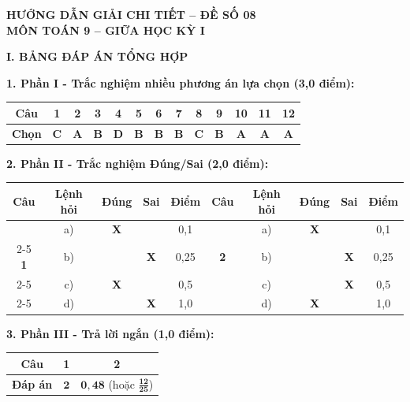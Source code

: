 \documentclass[12pt,a4paper]{article}
\begin{document}
\begin{center}
  \textbf{\Large HƯỚNG DẪN GIẢI CHI TIẾT -- ĐỀ SỐ 08}\\
  \textbf{\large MÔN TOÁN 9 -- GIỮA HỌC KỲ I}
\end{center}
\vspace{2mm}

\noindent\textbf{\large I. BẢNG ĐÁP ÁN TỔNG HỢP}

\vspace{1mm}
\noindent\textbf{1. Phần I - Trắc nghiệm nhiều phương án lựa chọn (3,0 điểm):}
\begin{center}
\begin{tabular}{|c|c|c|c|c|c|c|c|c|c|c|c|c|}
\hline
\textbf{Câu} & \textbf{1} & \textbf{2} & \textbf{3} & \textbf{4} & \textbf{5} & \textbf{6} & \textbf{7} & \textbf{8} & \textbf{9} & \textbf{10} & \textbf{11} & \textbf{12} \\
\hline
\textbf{Chọn} & \textbf{C} & \textbf{A} & \textbf{B} & \textbf{D} & \textbf{B} & \textbf{B} & \textbf{B} & \textbf{C} & \textbf{B} & \textbf{A} & \textbf{A} & \textbf{A} \\
\hline
\end{tabular}
\end{center}
\vspace{1mm}

\noindent\textbf{2. Phần II - Trắc nghiệm Đúng/Sai (2,0 điểm):}
\begin{center}
\begin{tabular}{|c|c|c|c|c||c|c|c|c|c|}
\hline
\textbf{Câu} & \textbf{Lệnh hỏi} & \textbf{Đúng} & \textbf{Sai} & \textbf{Điểm} & \textbf{Câu} & \textbf{Lệnh hỏi} & \textbf{Đúng} & \textbf{Sai} & \textbf{Điểm} \\
\hline
 & a) & \textbf{X} & & 0,1 & & a) & \textbf{X} & & 0,1 \\
\cline{2-5}\cline{7-10}
\textbf{1} & b) & & \textbf{X} & 0,25 & \textbf{2} & b) & & \textbf{X} & 0,25 \\
\cline{2-5}\cline{7-10}
 & c) & \textbf{X} & & 0,5 & & c) & & \textbf{X} & 0,5 \\
\cline{2-5}\cline{7-10}
 & d) & & \textbf{X} & 1,0 & & d) & \textbf{X} & & 1,0 \\
\hline
\end{tabular}
\end{center}
\vspace{1mm}

\noindent\textbf{3. Phần III - Trả lời ngắn (1,0 điểm):}
\begin{center}
\begin{tabular}{|c|c|c|}
\hline
\textbf{Câu} & \textbf{1} & \textbf{2} \\
\hline
\textbf{Đáp án} & $\mathbf{2}$ & $\mathbf{0{,}48}$ (hoặc $\mathbf{\frac{12}{25}}$) \\
\hline
\end{tabular}
\end{center}
\vspace{3mm}
\end{document}
